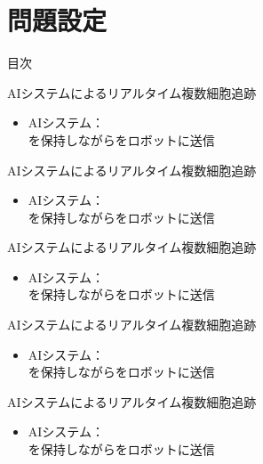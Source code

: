\section{問題設定}

\begin{frame}[noframenumbering]{目次}
    \tableofcontents[currentsection]
\end{frame}

\begin{frame}{AIシステムによるリアルタイム複数細胞追跡}
    \begin{itemize}
        \item AIシステム：
        \\\ra {}を保持しながらをロボットに送信
    \end{itemize}
\end{frame}
\begin{frame}[noframenumbering]{AIシステムによるリアルタイム複数細胞追跡}
    \begin{itemize}
        \item AIシステム：
        \\\ra {}を保持しながらをロボットに送信
    \end{itemize}
\end{frame}
\begin{frame}[noframenumbering]{AIシステムによるリアルタイム複数細胞追跡}
    \begin{itemize}
        \item AIシステム：
        \\\ra {}を保持しながらをロボットに送信
    \end{itemize}
\end{frame}
\begin{frame}[noframenumbering]{AIシステムによるリアルタイム複数細胞追跡}
    \begin{itemize}
        \item AIシステム：
        \\\ra {}を保持しながらをロボットに送信
    \end{itemize}
\end{frame}
\begin{frame}[noframenumbering]{AIシステムによるリアルタイム複数細胞追跡}
    \begin{itemize}
        \item AIシステム：
        \\\ra {}を保持しながらをロボットに送信
    \end{itemize}
\end{frame}

